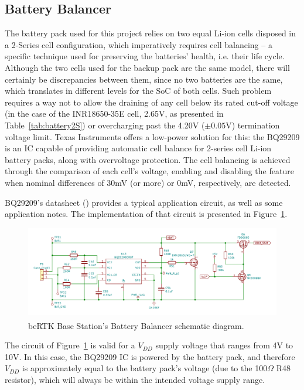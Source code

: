 \subsection{Battery Balancer}\label{sec:3212_BQ29209}

The battery pack used for this project relies on two equal Li-ion cells disposed in a 2-Series cell configuration, which imperatively requires cell balancing -- a specific technique used for preserving the batteries' health, i.e. their life cycle. Although the two cells used for the backup pack are the same model, there will certainly be discrepancies between them, since no two batteries are the same, which translates in different levels for the \gls{SoC} of both cells. Such problem requires a way not to allow the draining of any cell below its rated cut-off voltage (in the case of the INR18650-35E cell, 2.65V, as presented in Table~\ref{tab:battery2S}) or overcharging past the 4.20V ($\pm0.05$V) termination voltage limit. Texas Instruments offers a low-power solution for this: the BQ29209 is an IC capable of providing automatic cell balance for 2-series cell Li-ion battery packs, along with overvoltage protection. The cell balancing is achieved through the comparison of each cell's voltage, enabling and disabling the feature when nominal differences of 30mV (or more) or 0mV, respectively, are detected.

BQ29209's datasheet (\cite{bq29209}) provides a typical application circuit, as well as some application notes. The implementation of that circuit is presented in Figure~\ref{fig:BQ29209_circuit}.

\begin{figure}[H]
    \centering
    \includegraphics[width=1.0\textwidth]{Chapters/Figures/chapter3/Battery_Balancer.pdf}
    \caption{beRTK\textsuperscript{\textregistered} Base Station's Battery Balancer schematic diagram.}
    \label{fig:BQ29209_circuit}
\end{figure}

The circuit of Figure~\ref{fig:BQ29209_circuit} is valid for a $V_{DD}$ supply voltage that ranges from 4V to 10V. In this case, the BQ29209 IC is powered by the battery pack, and therefore $V_{DD}$ is approximately equal to the battery pack's voltage (due to the 100$\Omega$ R48 resistor), which will always be within the intended voltage supply range.

